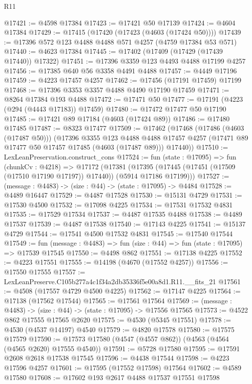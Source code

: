 \begin{lexlean}{R11}
\begin{coremodule}
@17421 := @4598 @17384
@17423 := @17421 @50 @17139
@17424 := @4604 @17384
@17429 := @17415 (@17420 (@17423 (@4603 (@17424 @50))))
@17439 := @17396 @572 @123 @4488 @4488 @571 @4257 (@4759 @17384 @53 @571)
@17440 := @4623 @17384
@17445 := @17402 (@17409 (@17429 (@17439 @17440)) @17322)
@17451 := @17396 @3359 @123 @4493 @4488 @17199 @4257
@17456 := @17385 @640 @56 @3358 @4491 @4488
@17457 := @4449 @17196
@17459 := @4223 @17457 @4257
@17462 := @17456 (@17191 @17459) @17199
@17468 := @17396 @3353 @3357 @4488 @4490 @17190 @17459
@17471 := @8264 @17384 @193 @4488
@17472 := @17471 @50
@17477 := @17191 (@4223 (@294 (@4443 @17183)) @17459)
@17480 := @17472 @17477 @50 @17190
@17485 := @17421 @89 @17184 (@4603 (@17424 @89))
@17486 := @17480 @17485
@17487 := @8323 @17477
@17509 := @17462
    (@17468
      (@17486 (@4603 (@17487 @50)))
      (@17396
        @3355
        @123
        @4488
        @4488
        @17457
        @4257
        (@17471 @89 @17477 @50 @17457 @17485 (@4603 (@17487 @89)))
        @17440))
@17510 := LexLeanPreservation.construct_cons
@17524 := fun (state : @17095) =>
  fun (chunkCv : @4218) =>
  @17172
    (@17381 (@17395 (@17445 (@17451 (@17509 (@17510 @17190 @17197)) @17440)) (@5914 @17186 @17199)))
@17527 := (message : @4483) -> (size : @44) -> (state : @17095) -> @4484
@17528 := @4489 @16447
@17529 := @4487 @17528
@17530 := @15131 @4729
@17531 := @17530 @4500
@17532 := @17098 @4225
@17534 := @17531 @17532 @4831
@17535 := @17529 @17534
@17537 := @4487 @17535 @4488
@17538 := @4489 @17537
@17539 := @4487 @17538
@17540 := @17143 @4225
@17541 := @15137 @4729
@17544 := @17541 @4500 @17532 @4831
@17545 := @17540 @17544
@17549 := fun (message : @4483) => fun (size : @44) => fun (state : @17095) => @17539 @17545
@17550 := @4498 @862
@17551 := @17138 @4225
@17552 := @4223 @17551
@17555 := @14198 (@4670 (@17552 @4257))
@17556 := @17550 @17555
@17557 := LexLeanPreserve.C105b277a4c1f34a2db35336f5e00a8d1.R11.__fits_21
@17561 := @4508 (@17557 @4729 @4500 @4225)
@17562 := @17147 @4225
@17564 := @17138 (@17562 @17544)
@17565 := @17561 @17564
@17569 := (message : @4483) -> (size : @44) -> (state : @17095) -> @17556 @17565
@17573 := @4522 @862 @17555 @17565 @2620
@17575 := @4530 (@5345 @17551)
@17578 := @4530 (@4537 @14197) @4540
@17579 := @4820 @17578
@17580 := @17575 @17579
@17590 := @17573 @17580 (@4547 (@4557 @862)) (@4563 (@4564 (@4565 @2620) @17555 @4540))
@17591 := @5728 @17580
@17595 := @17591 @2608 @2618 @17538 @17545
@17596 := @4438 @17544
@17598 := @4223 @17596 @4257
@17601 := @17595 (@17552 @17598) @17564
@17602 := @4589 @17580
@17608 := @17602 @193 @2617 @4488 @17537 @17551 @17598

\end{coremodule}
\end{lexlean}
